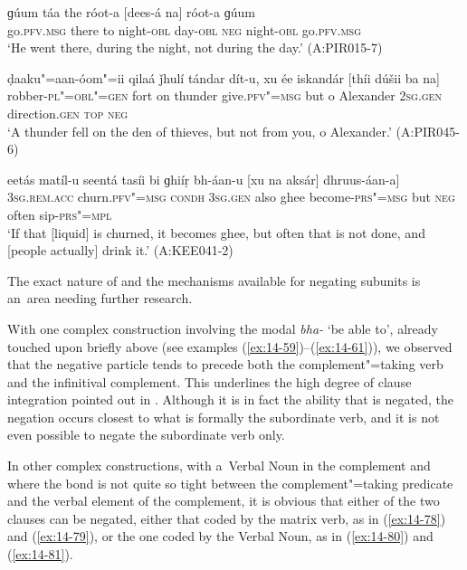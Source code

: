 \begin{exe}
\ex
\label{ex:14-75}
\gll ɡúum táa the róot-a [dees-á na] róot-a  ɡúum \\
go.\textsc{pfv.msg} there to night-\textsc{obl} day-\textsc{obl} \textsc{neg} night-\textsc{obl}  go.\textsc{pfv.msg}  \\
\glt `He went there, during the night, not during the day.' (A:PIR015-7)

\ex
\label{ex:14-76}
\gll ḍaaku"=aan-óom"=ii qilaá ǰhulí tándar dít-u, xu ée iskandár [thíi dúšii ba na] \\
robber-\textsc{pl"=obl"=gen} fort on thunder give.\textsc{pfv"=msg} but o Alexander \textsc{2sg.gen} direction.\textsc{gen} \textsc{top} \textsc{neg} \\
\glt `A thunder fell on the den of thieves, but not from you, o Alexander.' (A:PIR045-6)

\ex
\label{ex:14-77}
\gll eetás matíl-u seentá tasíi bi ɡhiíṛ  bh-áan-u [xu na aksár] dhruus-áan-a]\\
\textsc{3sg.rem.acc} churn.\textsc{pfv"=msg} \textsc{condh} \textsc{3sg.gen} also ghee  become-\textsc{prs"=msg} but \textsc{neg} often sip-\textsc{prs"=mpl}  \\
\glt `If that [liquid] is churned, it becomes ghee, but often that is not done, and [people actually] drink it.' (A:KEE041-2)
\end{exe}

The exact nature of and the mechanisms available for negating subunits is an~area needing further research.


 With one complex construction involving the modal \textit{bha-} `be able to', already touched upon briefly above (see examples (\ref{ex:14-59})--(\ref{ex:14-61})), we observed that the negative particle tends to precede both the complement"=taking verb and the infinitival complement. This underlines the high degree of clause integration pointed out in . Although it is in fact the ability that is negated, the negation occurs closest to what is formally the subordinate verb, and it is not even possible to negate the subordinate verb only.


In other complex constructions, with a~Verbal Noun in the complement and where the bond is not quite so tight between the complement"=taking predicate and the verbal element of the complement, it is obvious that either of the two clauses can be negated, either that coded by the matrix verb, as in (\ref{ex:14-78}) and (\ref{ex:14-79}), or the one coded by the Verbal Noun, as in (\ref{ex:14-80}) and (\ref{ex:14-81}). 

